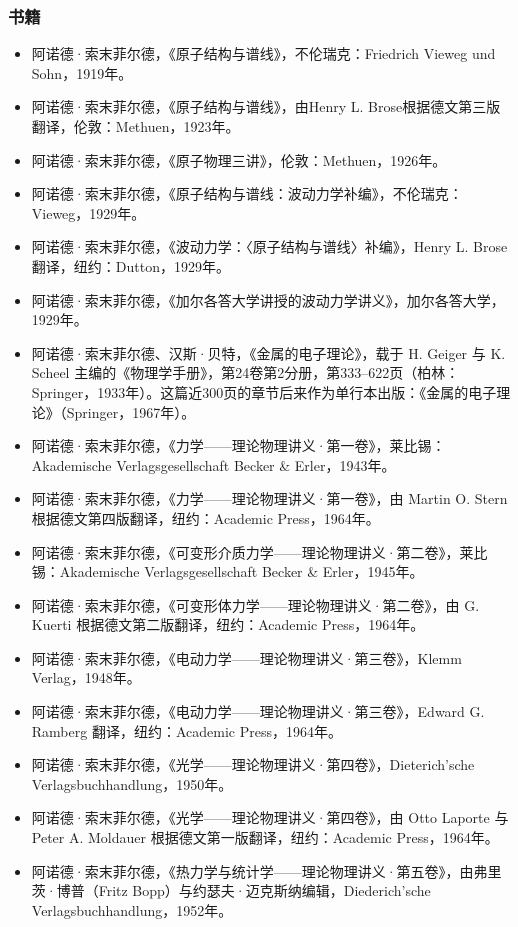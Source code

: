 \subsubsection{书籍}
\begin{itemize}
\item 阿诺德·索末菲尔德，《原子结构与谱线》，不伦瑞克：Friedrich Vieweg und Sohn，1919年。
\item 阿诺德·索末菲尔德，《原子结构与谱线》，由Henry L. Brose根据德文第三版翻译，伦敦：Methuen，1923年。
\item 阿诺德·索末菲尔德，《原子物理三讲》，伦敦：Methuen，1926年。
\item 阿诺德·索末菲尔德，《原子结构与谱线：波动力学补编》，不伦瑞克：Vieweg，1929年。
\item 阿诺德·索末菲尔德，《波动力学：〈原子结构与谱线〉补编》，Henry L. Brose 翻译，纽约：Dutton，1929年。
\item 阿诺德·索末菲尔德，《加尔各答大学讲授的波动力学讲义》，加尔各答大学，1929年。
\item 阿诺德·索末菲尔德、汉斯·贝特，《金属的电子理论》，载于 H. Geiger 与 K. Scheel 主编的《物理学手册》，第24卷第2分册，第333–622页（柏林：Springer，1933年）。这篇近300页的章节后来作为单行本出版：《金属的电子理论》（Springer，1967年）。
\item 阿诺德·索末菲尔德，《力学——理论物理讲义·第一卷》，莱比锡：Akademische Verlagsgesellschaft Becker & Erler，1943年。
\item 阿诺德·索末菲尔德，《力学——理论物理讲义·第一卷》，由 Martin O. Stern 根据德文第四版翻译，纽约：Academic Press，1964年。
\item 阿诺德·索末菲尔德，《可变形介质力学——理论物理讲义·第二卷》，莱比锡：Akademische Verlagsgesellschaft Becker & Erler，1945年。
\item 阿诺德·索末菲尔德，《可变形体力学——理论物理讲义·第二卷》，由 G. Kuerti 根据德文第二版翻译，纽约：Academic Press，1964年。
\item 阿诺德·索末菲尔德，《电动力学——理论物理讲义·第三卷》，Klemm Verlag，1948年。
\item 阿诺德·索末菲尔德，《电动力学——理论物理讲义·第三卷》，Edward G. Ramberg 翻译，纽约：Academic Press，1964年。
\item 阿诺德·索末菲尔德，《光学——理论物理讲义·第四卷》，Dieterich’sche Verlagsbuchhandlung，1950年。
\item 阿诺德·索末菲尔德，《光学——理论物理讲义·第四卷》，由 Otto Laporte 与 Peter A. Moldauer 根据德文第一版翻译，纽约：Academic Press，1964年。
\item 阿诺德·索末菲尔德，《热力学与统计学——理论物理讲义·第五卷》，由弗里茨·博普（Fritz Bopp）与约瑟夫·迈克斯纳编辑，Diederich’sche Verlagsbuchhandlung，1952年。

\end{itemize}
